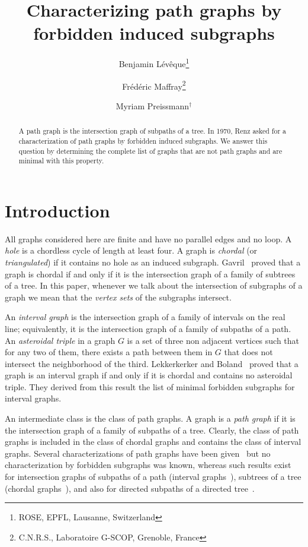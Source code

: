 \documentclass[11pt]{article}
\title{Characterizing path graphs by forbidden induced subgraphs}
\author{Benjamin L\'ev\^eque\thanks{ROSE, EPFL, Lausanne, Switzerland}
\and Fr\'ed\'eric Maffray\thanks{C.N.R.S., Laboratoire G-SCOP,
Grenoble, France} \and Myriam Preissmann$^\dagger$}
\begin{document}
\maketitle

\begin{abstract}
A path graph is the intersection graph of subpaths of a tree.  In
1970, Renz asked for a characterization of path graphs by forbidden
induced subgraphs.  We answer this question by determining the
complete list of graphs that are not path graphs and are minimal with
this property.
\end{abstract}

\section{Introduction}

All graphs considered here are finite and have no parallel edges and
no loop.  A \emph{hole} is a chordless cycle of length at least four.
A graph is \emph{chordal} (or \emph{triangulated}) if it contains no
hole as an induced subgraph.  Gavril~\cite{Gav74} proved that a graph
is chordal if and only if it is the intersection graph of a family of
subtrees of a tree.  In this paper, whenever we talk about the
intersection of subgraphs of a graph we mean that the \emph{vertex
sets} of the subgraphs intersect.

An \emph{interval graph} is the intersection graph of a family of
intervals on the real line; equivalently, it is the intersection graph
of a family of subpaths of a path.  An \emph{asteroidal triple} in a
graph $G$ is a set of three non adjacent vertices such that for any
two of them, there exists a path between them in $G$ that does not
intersect the neighborhood of the third.  Lekkerkerker and
Boland~\cite{LB62} proved that a graph is an interval graph if and
only if it is chordal and contains no asteroidal triple.  They derived
from this result the list of minimal forbidden subgraphs for interval
graphs.

An intermediate class is the class of path graphs.  A graph is a
\emph{path graph} if it is the intersection graph of a family of
subpaths of a tree.  Clearly, the class of path graphs is included in
the class of chordal graphs and contains the class of interval graphs.
Several characterizations of path graphs have been
given~\cite{Gav78,MW86, Ren70} but no characterization by forbidden
subgraphs was known, whereas such results exist for intersection
graphs of subpaths of a path (interval graphs~\cite{LB62}), subtrees
of a tree (chordal graphs~\cite{Gav74}), and also for directed
subpaths of a directed tree~\cite{Pan99}.
\end{document}
